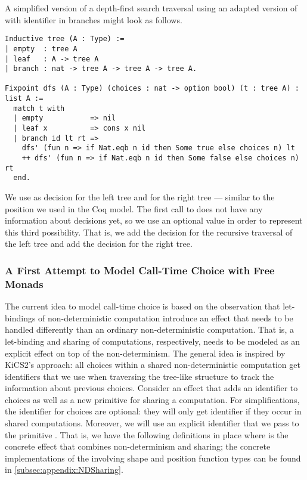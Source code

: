 A simplified version of a depth-first search traversal using an adapted version of  with identifier in branches might look as follows.

\begin{verbatim}
Inductive tree (A : Type) :=
| empty  : tree A
| leaf   : A -> tree A
| branch : nat -> tree A -> tree A -> tree A.

Fixpoint dfs (A : Type) (choices : nat -> option bool) (t : tree A) : list A :=
  match t with
  | empty           => nil
  | leaf x          => cons x nil
  | branch id lt rt =>
    dfs' (fun n => if Nat.eqb n id then Some true else choices n) lt
    ++ dfs' (fun n => if Nat.eqb n id then Some false else choices n) rt
  end.
\end{verbatim}

We use  as decision for the left tree and  for the right tree --- similar to the position we used in the Coq model.
The first call to  does not have any information about decisions yet, so we use an optional value in order to represent this third possibility.
That is, we add the decision  for the recursive traversal of the left tree and add the decision  for the right tree.

\subsubsection{A First Attempt to Model Call-Time Choice with Free
  Monads}
\label{subsubsec:modelcalltime}

The current idea to model call-time choice is based on the observation that let-bindings of non-deterministic computation introduce an effect that needs to be handled differently than an ordinary non-deterministic computation.
That is, a let-binding and sharing of computations, respectively, needs to be modeled as an explicit effect on top of the
non-determinism.
The general idea is inspired by KiCS2's approach: all choices within a shared non-deterministic computation get identifiers that we use when traversing the tree-like structure to track the information about previous choices.
Consider an effect  that adds an identifier to choices as well as a new primitive for sharing a computation.
For simplifications, the identifier for choices are optional: they will only get identifier if they occur in shared computations.
Moreover, we will use an explicit identifier that we pass to the primitive .
That is, we have the following definitions in place where  is the concrete effect that combines non-determinism
and sharing; the concrete implementations of the involving shape and position function types can be found in \autoref{subsec:appendix:NDSharing}.

